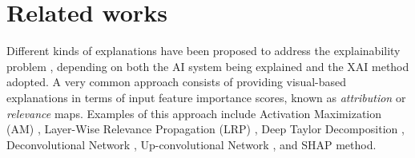 \section{Related works}
\label{sec:related}
Different kinds of explanations have been proposed to address the explainability problem \citep{bach2015,dosovitskiy2016,ribeiro2016should,NIPS2017_7062,selvaraju2017grad}, depending on both the AI system being explained and the XAI method adopted. A very common approach consists of providing visual-based explanations in terms of input feature importance scores, known as \textit{attribution } or \textit{relevance } maps. Examples of this approach include Activation Maximization (AM) \citep{erhan2009}, Layer-Wise Relevance Propagation (LRP) \citep{bach2015}, Deep Taylor Decomposition \citep{binder2016,montavon2017_2}, Deconvolutional Network \citep{zeiler2011}, Up-convolutional Network \citep{zeiler2014,dosovitskiy2016}, and SHAP method\citep{NIPS2017_7062}. 



